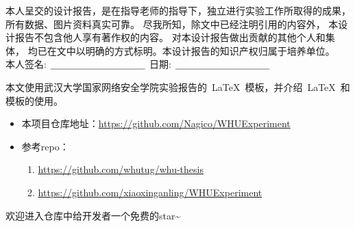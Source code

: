 


\newpage
\thispagestyle{empty}
\vspace*{20pt}
\begin{center}{}\end{center}
\par\vspace*{30pt}
\renewcommand{\baselinestretch}{2}

{%

本人呈交的设计报告，是在指导老师的指导下，独立进行实验工作所取得的成果，
所有数据、图片资料真实可靠。 尽我所知，除文中已经注明引用的内容外，
本设计报告不包含他人享有著作权的内容。
对本设计报告做出贡献的其他个人和集体，
均已在文中以明确的方式标明。本设计报告的知识产权归属于培养单位。\\[2cm]

\hspace*{1cm}本人签名: $\underline{\hspace{3.5cm}}$
\hspace{2cm}日期: $\underline{\hspace{3.5cm}}$\hfill\par}
\baselineskip=23pt  %





\begin{cnabstract}
\thispagestyle{empty}

本文使用武汉大学国家网络安全学院实验报告的~\LaTeX~模板，并介绍~\LaTeX~和模板的使用。

\begin{itemize}
  \item 本项目仓库地址：\url{https://github.com/Nagico/WHUExperiment}
  \item 参考repo：
  \begin{enumerate}
    \item \url{https://github.com/whutug/whu-thesis}
    \item \url{https://github.com/xiaoxinganling/WHUExperiment}
  \end{enumerate}
\end{itemize}

欢迎进入仓库中给开发者一个免费的star\textasciitilde


\end{cnabstract}
\par
\vspace*{2em}





